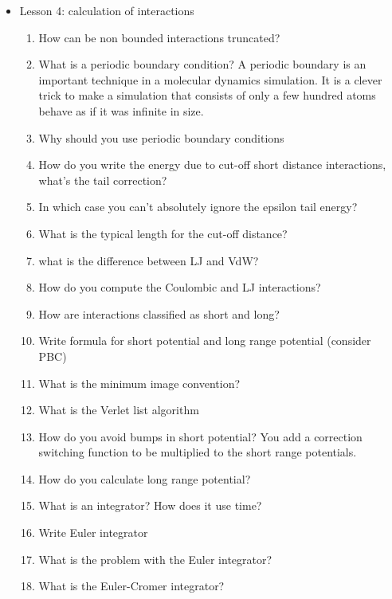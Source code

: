 {\begin{itemize}
\begin{enumerate}
        \item What are the differences between VdW and Coulomb interactions?
        \item What is the difference between bonded and non-bonded interactions?
    \end{enumerate}    
    \item Lesson 4: calculation of interactions
    \begin{enumerate}
        \item How can be non bounded interactions truncated?
        \item What is a periodic boundary condition? A periodic boundary is an important technique in a molecular dynamics simulation. It is a clever trick to make a simulation that consists of only a few hundred atoms behave as if it was infinite in size.
        \item Why should you use periodic boundary conditions 
        \item How do you write the energy due to cut-off short distance interactions, what's the tail correction?
        \item In which case you can't absolutely ignore the epsilon tail energy?
        \item What is the typical length for the cut-off distance?
        \item what is the difference between LJ and VdW?
        \item How do you compute the Coulombic and LJ interactions?
        \item How are interactions classified as short and long?
        \item Write formula for short potential and long range potential (consider PBC)
        \item What is the minimum image convention?
        \item What is the Verlet list algorithm
        \item How do you avoid bumps in short potential? You add a correction switching function to be multiplied to the short range potentials.
        \item How do you calculate long range potential? %
        \item What is an integrator? How does it use time?
        \item Write Euler integrator
        \item What is the problem with the Euler integrator?
        \item What is the Euler-Cromer integrator?

\end{enumerate}
\end{itemize}}
